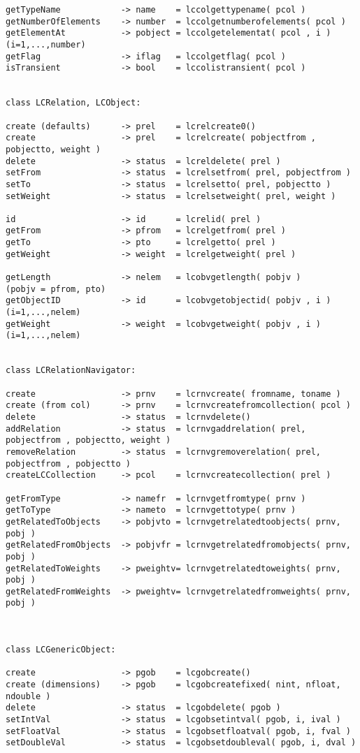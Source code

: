 \begin{scriptsize}
\begin{verbatim}
getTypeName            -> name    = lccolgettypename( pcol )
getNumberOfElements    -> number  = lccolgetnumberofelements( pcol )
getElementAt           -> pobject = lccolgetelementat( pcol , i )  (i=1,...,number)
getFlag                -> iflag   = lccolgetflag( pcol )
isTransient            -> bool    = lccolistransient( pcol )


class LCRelation, LCObject:

create (defaults)      -> prel    = lcrelcreate0()
create                 -> prel    = lcrelcreate( pobjectfrom , pobjectto, weight )
delete                 -> status  = lcreldelete( prel )
setFrom                -> status  = lcrelsetfrom( prel, pobjectfrom )
setTo                  -> status  = lcrelsetto( prel, pobjectto )
setWeight              -> status  = lcrelsetweight( prel, weight )

id                     -> id      = lcrelid( prel )
getFrom                -> pfrom   = lcrelgetfrom( prel )
getTo                  -> pto     = lcrelgetto( prel )
getWeight              -> weight  = lcrelgetweight( prel )

getLength              -> nelem   = lcobvgetlength( pobjv )        (pobjv = pfrom, pto)
getObjectID            -> id      = lcobvgetobjectid( pobjv , i )  (i=1,...,nelem)
getWeight              -> weight  = lcobvgetweight( pobjv , i )    (i=1,...,nelem)


class LCRelationNavigator:

create                 -> prnv    = lcrnvcreate( fromname, toname )
create (from col)      -> prnv    = lcrnvcreatefromcollection( pcol )
delete                 -> status  = lcrnvdelete()
addRelation            -> status  = lcrnvgaddrelation( prel, pobjectfrom , pobjectto, weight )
removeRelation         -> status  = lcrnvgremoverelation( prel, pobjectfrom , pobjectto )
createLCCollection     -> pcol    = lcrnvcreatecollection( prel )

getFromType            -> namefr  = lcrnvgetfromtype( prnv )
getToType              -> nameto  = lcrnvgettotype( prnv )
getRelatedToObjects    -> pobjvto = lcrnvgetrelatedtoobjects( prnv, pobj )
getRelatedFromObjects  -> pobjvfr = lcrnvgetrelatedfromobjects( prnv, pobj )
getRelatedToWeights    -> pweightv= lcrnvgetrelatedtoweights( prnv, pobj )
getRelatedFromWeights  -> pweightv= lcrnvgetrelatedfromweights( prnv, pobj )



class LCGenericObject:

create                 -> pgob    = lcgobcreate()
create (dimensions)    -> pgob    = lcgobcreatefixed( nint, nfloat, ndouble )
delete                 -> status  = lcgobdelete( pgob )
setIntVal              -> status  = lcgobsetintval( pgob, i, ival )
setFloatVal            -> status  = lcgobsetfloatval( pgob, i, fval )
setDoubleVal           -> status  = lcgobsetdoubleval( pgob, i, dval )


\end{verbatim}
\end{scriptsize}
